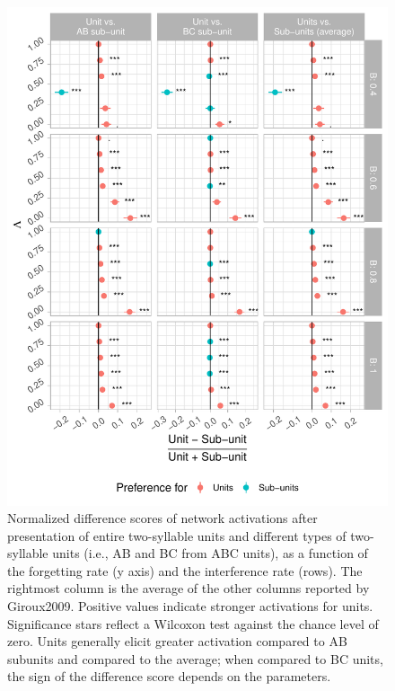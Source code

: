 \documentclass[
]{article}
\begin{document}
\begin{figure}

{\centering \includegraphics[width=1\linewidth]{tp_model_subunits_files/figure-latex/subunit-experiment-global-create-plot_diff-fw-by-b-details-1} 

}

\caption{Normalized difference scores of network activations after presentation of entire two-syllable units and different types of two-syllable units (i.e., AB and BC from ABC units), as a function of the forgetting rate (y axis) and the interference rate (rows). The rightmost column is the average of the other columns reported by Giroux2009. Positive values indicate stronger activations for units. Significance stars reflect a Wilcoxon test against the chance level of zero. Units generally elicit greater activation compared to AB subunits and compared to the average; when compared to BC units, the sign of the difference score depends on the parameters.}\label{figsubunit-experiment-global-create-plot_diff-fw-by-b-details}
\end{figure}
\end{document}
